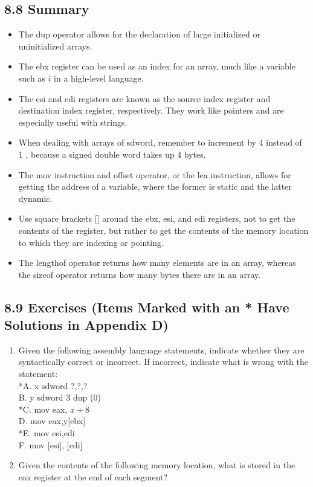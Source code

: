 \documentclass[10pt]{book}
\begin{document}
\begin{center}
\begin{center}
\begin{center}
\subsection*{8.8 Summary}
\begin{itemize}
  \item The dup operator allows for the declaration of large initialized or uninitialized arrays.
  \item The ebx register can be used as an index for an array, much like a variable such as $i$ in a high-level language.
  \item The esi and edi registers are known as the source index register and destination index register, respectively. They work like pointers and are especially useful with strings.
  \item When dealing with arrays of sdword, remember to increment by 4 instead of 1 , because a signed double word takes up 4 bytes.
  \item The mov instruction and offset operator, or the lea instruction, allows for getting the address of a variable, where the former is static and the latter dynamic.
  \item Use square brackets [] around the ebx, esi, and edi registers, not to get the contents of the register, but rather to get the contents of the memory location to which they are indexing or pointing.
  \item The lengthof operator returns how many elements are in an array, whereas the sizeof operator returns how many bytes there are in an array.
\end{itemize}

\subsection*{8.9 Exercises (Items Marked with an * Have Solutions in Appendix D)}
\begin{enumerate}
  \item Given the following assembly language statements, indicate whether they are syntactically correct or incorrect. If incorrect, indicate what is wrong with the statement:\\
*A. x sdword ?,?,?\\
B. y sdword 3 dup (0)\\
*C. mov eax, $x+8$\\[0pt]
D. mov eax,y[ebx]\\
*E. mov esi,edi\\[0pt]
F. mov [esi], [edi]
  \item Given the contents of the following memory location, what is stored in the eax register at the end of each segment?
\end{enumerate}


\end{center}
\end{center}
\end{center}
\end{document}
